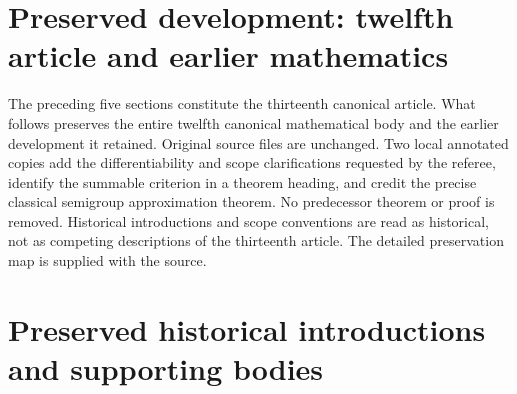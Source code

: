 \newif\ifcomplete\completetrue


\clearpage
\section*{Preserved development: twelfth article and earlier mathematics}
The preceding five sections constitute the thirteenth canonical article.
What follows preserves the entire twelfth canonical mathematical body
and the earlier development it retained. Original source files are
unchanged. Two local annotated copies add the differentiability and
scope clarifications requested by the referee, identify the summable
criterion in a theorem heading, and credit the precise classical
semigroup approximation theorem. No predecessor theorem or proof is
removed. Historical introductions and scope conventions are read as
historical, not as competing descriptions of the thirteenth article.
The detailed preservation map is supplied with the source.

\clearpage
\section*{Preserved historical introductions and supporting bodies}























